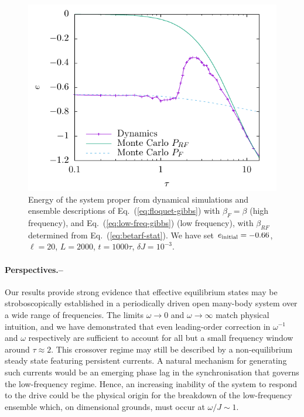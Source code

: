 \documentclass[prl,aps,twocolumn,notitlepage,10pt]{revtex4-1}
\begin{document}
\begin{figure}[hb!]
  \includegraphics[width=\linewidth]{figs/fig-3-beta-comp.pdf}
  \caption{Energy of the system proper from dynamical simulations and
    ensemble descriptions of
    Eq.~(\ref{eq:floquet-gibbs}) with $\beta_{F} = \beta$ (high
    frequency), and
    Eq.~(\ref{eq:low-freq-gibbs}) (low frequency), with $\beta_{RF}$
    determined from Eq.~(\ref{eq:betarf-stat}).
    We have set $e_{\rm initial}=-0.66$, $\ell=20$, $L=2000$, $t=1000\tau$, $\delta J = 10^{-3}$.
  }
  \label{fig:beta-comp}
\end{figure}

\paragraph{Perspectives.--}
Our results provide strong evidence that effective equilibrium states may be
stroboscopically established in a periodically driven open many-body system
over a wide range of frequencies.
The limits $\omega \to 0$ and $\omega \to \infty$ match physical intuition, and
we have demonstrated that even leading-order correction in $\omega^{-1}$ and
$\omega$ respectively are sufficient to account for all but a small frequency
window around $\tau \approx 2$.
This crossover regime may still be described by a non-equilibrium
steady state featuring persistent currents.
A natural mechanism for generating such currents would be an emerging phase lag
in the synchronisation that governs the low-frequency regime.
Hence, an increasing inability of the system to respond to the drive could be
the physical origin for the breakdown of the low-frequency ensemble which, on
dimensional grounds, must occur at $\omega/J \sim 1$.
\end{document}
